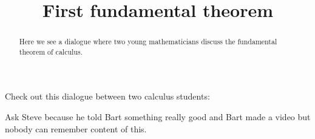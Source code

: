 \documentclass{ximera}
\title[Break-Ground:]{First fundamental theorem}
\begin{document}
\begin{abstract}
Here we see a dialogue where two young mathematicians discuss the fundamental theorem of calculus.
\end{abstract}
\maketitle

Check out this dialogue between two calculus students:

Ask Steve because he told Bart something really good and Bart made a video but nobody can remember content of this.



\end{document}
